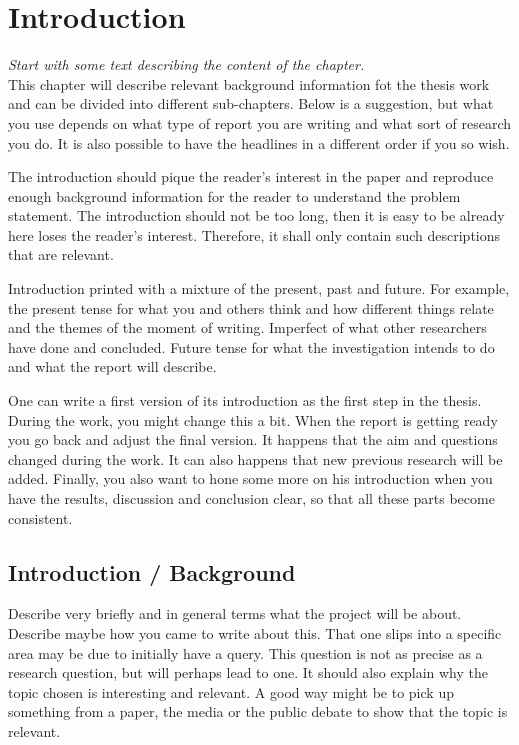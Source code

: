 \chapter{Introduction}
\emph{Start with some text describing the content of the chapter.}\\

\noindent This chapter will describe relevant background information fot the thesis work and can be divided into different sub-chapters. Below is a suggestion, but what you use depends on what type of report you are writing and what sort of research you do. It is also possible to have the headlines in a different order if you so wish.

The introduction should pique the reader's interest in the paper and reproduce enough background information for the reader to understand the problem statement. The introduction should not be too long, then it is easy to be already here loses the reader's interest. Therefore, it shall only contain such descriptions that are relevant.

Introduction printed with a mixture of the present, past and future. For example, the present tense for what you and others think and how different things relate and the themes of the moment of writing. Imperfect of what other researchers have done and concluded. Future tense for what the investigation intends to do and what the report will describe.

One can write a first version of its introduction as the first step in the thesis. During the work, you might change this a bit. When the report is getting ready you go back and adjust the final version. It happens that the aim and questions changed during the work. It can also happens that new previous research will be added. Finally, you also want to hone some more on his introduction when you have the results, discussion and conclusion clear, so that all these parts become consistent.

\section{Introduction / Background}
Describe very briefly and in general terms what the project will be about. Describe maybe how you came to write about this. That one slips into a specific area may be due to initially have a query. This question is not as precise as a research question, but will perhaps lead to one. It should also explain why the topic chosen is interesting and relevant. A good way might be to pick up something from a paper, the media or the public debate to show that the topic is relevant.

